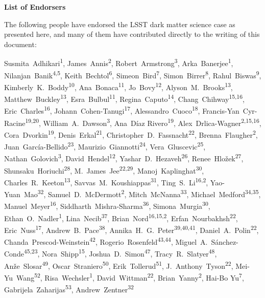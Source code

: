 
\begin{center}
  {\Large \bf List of Endorsers}
\end{center}
\bigskip

The following people have endorsed the LSST dark matter science case as presented here, and many of them have contributed directly to the writing of this document:

\def\altaffilmark#1{\textsuperscript{#1}}
\def\affil#1{\noindent #1 \\}

\normalsize
\begin{raggedright}

Susmita~Adhikari\altaffilmark{1},
James~Annis\altaffilmark{2},
Robert~Armstrong\altaffilmark{3},
Arka~Banerjee\altaffilmark{1},
Nilanjan~Banik\altaffilmark{4,5},
Keith~Bechtol\altaffilmark{6},
Simeon~Bird\altaffilmark{7},
Simon~Birrer\altaffilmark{8},
Rahul~Biswas\altaffilmark{9},
Kimberly~K.~Boddy\altaffilmark{10},
Ana~Bonaca\altaffilmark{11},
Jo~Bovy\altaffilmark{12},
Alyson~M.~Brooks\altaffilmark{13},
Matthew~Buckley\altaffilmark{13},
Esra~Bulbul\altaffilmark{11},
Regina~Caputo\altaffilmark{14},
Chang~Chihway\altaffilmark{15,16},
Eric~Charles\altaffilmark{16},
Johann~Cohen-Tanugi\altaffilmark{17},
Alessandro~Cuoco\altaffilmark{18},
Francis-Yan~Cyr-Racine\altaffilmark{19,20},
William~A.~Dawson\altaffilmark{3},
Ana~D\'{i}az Rivero\altaffilmark{19},
Alex~Drlica-Wagner\altaffilmark{2,15,16},
Cora~Dvorkin\altaffilmark{19},
Denis~Erkal\altaffilmark{21},
Christopher~D.~Fassnacht\altaffilmark{22},
Brenna~Flaugher\altaffilmark{2},
Juan~Garc\'ia-Bellido\altaffilmark{23},
Maurizio~Giannotti\altaffilmark{24},
Vera~Gluscevic\altaffilmark{25},
Nathan~Golovich\altaffilmark{3},
David~Hendel\altaffilmark{12},
Yashar~D.~Hezaveh\altaffilmark{26},
Renee~Hlo\v{z}ek\altaffilmark{27},
Shunsaku~Horiuchi\altaffilmark{28},
M.~James~Jee\altaffilmark{22,29},
Manoj~Kaplinghat\altaffilmark{30},
Charles~R.~Keeton\altaffilmark{13},
Savvas~M.~Koushiappas\altaffilmark{31},
Ting~S.~Li\altaffilmark{16,2},
Yao-Yuan~Mao\altaffilmark{32},
Samuel~D.~McDermott\altaffilmark{2},
Mitch~McNanna\altaffilmark{33},
Michael~Medford\altaffilmark{34,35},
Manuel~Meyer\altaffilmark{16},
Siddharth~Mishra-Sharma\altaffilmark{36},
Simona~Murgia\altaffilmark{30},
Ethan~O.~Nadler\altaffilmark{1},
Lina~Necib\altaffilmark{37},
Brian~Nord\altaffilmark{16,15,2},
Erfan~Nourbakhsh\altaffilmark{22},
Eric~Nuss\altaffilmark{17},
Andrew~B.~Pace\altaffilmark{38},
Annika~H.~G.~Peter\altaffilmark{39,40,41},
Daniel~A.~Polin\altaffilmark{22},
Chanda~Prescod-Weinstein\altaffilmark{42},
Rogerio~Rosenfeld\altaffilmark{43,44},
Miguel~A.~S\'anchez-Conde\altaffilmark{45,23},
Nora~Shipp\altaffilmark{15},
Joshua~D.~Simon\altaffilmark{47},
Tracy~R.~Slatyer\altaffilmark{48},
An\v{z}e~Slosar\altaffilmark{49},
Oscar~Straniero\altaffilmark{50},
Erik~Tollerud\altaffilmark{51},
J.~Anthony~Tyson\altaffilmark{22},
Mei-Yu~Wang\altaffilmark{52},
Risa~Wechsler\altaffilmark{1},
David~Wittman\altaffilmark{22},
Brian~Yanny\altaffilmark{2},
Hai-Bo Yu\altaffilmark{7},
Gabrijela~Zaharijas\altaffilmark{53},
Andrew~Zentner\altaffilmark{32}


\end{raggedright}
